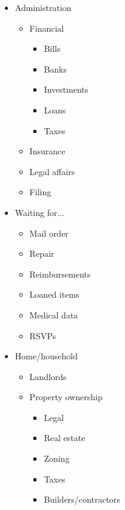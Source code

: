 \documentclass[10pt,landscape]{article}
\begin{document}
\begin{multicols}{3}
\begin{itemize}
\begin{itemize}
\end{itemize}

\item Administration \begin{itemize}
\item Financial \begin{itemize}
\item Bills 
\item Banks 
\item Investments 
\item Loans 
\item Taxes 

\end{itemize}

\item Insurance 
\item Legal affairs 
\item Filing 

\end{itemize}

\item Waiting for... \begin{itemize}
\item Mail order 
\item Repair 
\item Reimbursements 
\item Loaned items 
\item Medical data 
\item RSVPs 

\end{itemize}

\item Home/household \begin{itemize}
\item Landlords 
\item Property ownership \begin{itemize}
\item Legal 
\item Real estate 
\item Zoning 
\item Taxes 
\item Builders/contractors 

\end{itemize}


\end{itemize}
\end{itemize}
\end{multicols}
\end{document}
